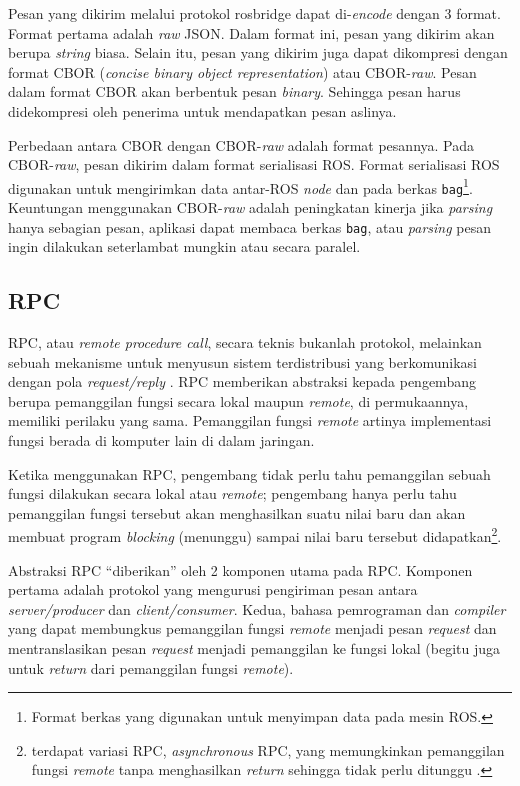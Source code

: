 Pesan yang dikirim melalui protokol rosbridge dapat di-\textit{encode} dengan 3
format. Format pertama adalah \textit{raw} JSON. Dalam format ini, pesan yang
dikirim akan berupa \textit{string} biasa. Selain itu, pesan yang dikirim juga
dapat dikompresi dengan format CBOR (\textit{concise binary object
    representation}) atau CBOR-\textit{raw}. Pesan dalam format CBOR akan
berbentuk pesan \textit{binary}. Sehingga pesan harus didekompresi oleh
penerima untuk mendapatkan pesan aslinya.

Perbedaan antara CBOR dengan CBOR-\textit{raw} adalah format pesannya. Pada
CBOR-\textit{raw}, pesan dikirim dalam format serialisasi ROS. Format
serialisasi ROS digunakan untuk mengirimkan data antar-ROS \textit{node} dan
pada berkas \texttt{bag}\footnote{Format berkas yang digunakan untuk menyimpan
    data pada mesin ROS.}. Keuntungan menggunakan CBOR-\textit{raw} adalah
peningkatan kinerja jika \textit{parsing} hanya sebagian pesan, aplikasi dapat
membaca berkas \texttt{bag}, atau \textit{parsing} pesan ingin dilakukan
seterlambat mungkin atau secara paralel.

\subsection{RPC}

RPC, atau \textit{remote procedure call}, secara teknis bukanlah protokol,
melainkan sebuah mekanisme untuk menyusun sistem terdistribusi yang
berkomunikasi dengan pola \textit{request/reply}
\parencite{larry_computerNetwork}. RPC memberikan abstraksi kepada pengembang
berupa pemanggilan fungsi secara lokal maupun \textit{remote}, di permukaannya,
memiliki perilaku yang sama. Pemanggilan fungsi \textit{remote} artinya
implementasi fungsi berada di komputer lain di dalam jaringan.

Ketika menggunakan RPC, pengembang tidak perlu tahu pemanggilan sebuah fung\-si
dilakukan secara lokal atau \textit{remote}; pengembang hanya perlu tahu
pemanggilan fungsi tersebut akan menghasilkan suatu nilai baru dan akan membuat
program \textit{blocking} (menunggu) sampai nilai baru tersebut
didapatkan\footnote{terdapat variasi RPC, \textit{asynchronous} RPC, yang
    memungkinkan pemanggilan fungsi \textit{remote} tanpa menghasilkan
    \textit{return} sehingga tidak perlu ditunggu \parencite{tanenbaum_distSys}.}.

Abstraksi RPC ``diberikan'' oleh 2 komponen utama pada RPC. Komponen pertama
adalah protokol yang mengurusi pengiriman pesan antara \textit{server/producer}
dan \textit{client/consumer}. Kedua, bahasa pemrograman dan \textit{compiler}
yang dapat membungkus pemanggilan fungsi \textit{remote} menjadi pesan
\textit{request} dan mentranslasikan pesan \textit{request} menjadi pemanggilan
ke fungsi lokal (begitu juga untuk \textit{return} dari pemanggilan fungsi
\textit{remote}).

